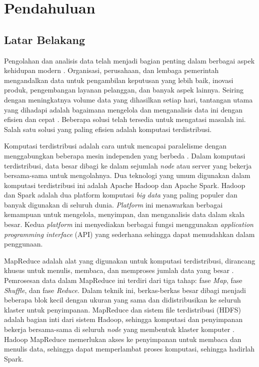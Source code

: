 \chapter{Pendahuluan}

\pagestyle{plain}

\section{Latar Belakang}

Pengolahan dan analisis data telah menjadi bagian penting dalam berbagai aspek kehidupan modern \cite{vermaBigDataManagement2016}. Organisasi, perusahaan, dan lembaga pemerintah mengandalkan data untuk pengambilan keputusan yang lebih baik, inovasi produk, pengembangan layanan pelanggan, dan banyak aspek lainnya. Seiring dengan meningkatnya volume data yang dihasilkan setiap hari, tantangan utama yang dihadapi adalah bagaimana mengelola dan menganalisis data ini dengan efisien dan cepat \cite{ahmadvandGapproxUsingGallup2019}. Beberapa solusi telah tersedia untuk mengatasi masalah ini. Salah satu solusi yang paling efisien adalah komputasi terdistribusi. 

Komputasi terdistribusi adalah cara untuk mencapai paralelisme dengan menggabungkan beberapa mesin independen yang berbeda \cite{bhattacharyaEvaluatingDistributedComputing2021}. Dalam komputasi terdistribusi, data besar dibagi ke dalam sejumlah \textit{node} atau server yang bekerja bersama-sama untuk mengolahnya. Dua teknologi yang umum digunakan dalam komputasi terdistribusi ini adalah Apache Hadoop dan Apache Spark. Hadoop dan Spark adalah dua platform komputasi \textit{big data} yang paling populer dan banyak digunakan di seluruh dunia. \textit{Platform} ini menawarkan berbagai kemampuan untuk mengelola, menyimpan, dan menganalisis data dalam skala besar. Kedua \textit{platform} ini menyediakan berbagai fungsi menggunakan \textit{application programming interface} (API) yang sederhana sehingga dapat memudahkan dalam penggunaan.

MapReduce adalah alat yang digunakan untuk komputasi terdistribusi, dirancang khusus untuk menulis, membaca, dan memproses jumlah data yang besar \cite{deanMapReduceSimplifiedData2004}. Pemrosesan data dalam MapReduce ini terdiri dari tiga tahap: fase \textit{Map}, fase \textit{Shuffle}, dan fase \textit{Reduce}. Dalam teknik ini, berkas-berkas besar dibagi menjadi beberapa blok kecil dengan ukuran yang sama dan didistribusikan ke seluruh klaster untuk penyimpanan. MapReduce dan sistem file terdistribusi (HDFS) adalah bagian inti dari sistem Hadoop, sehingga komputasi dan penyimpanan bekerja bersama-sama di seluruh \textit{node} yang membentuk klaster komputer \cite{samadiComparativeStudyHadoop2016}. Hadoop MapReduce memerlukan akses ke penyimpanan untuk membaca dan menulis data, sehingga dapat memperlambat proses komputasi, sehingga hadirlah Spark.

